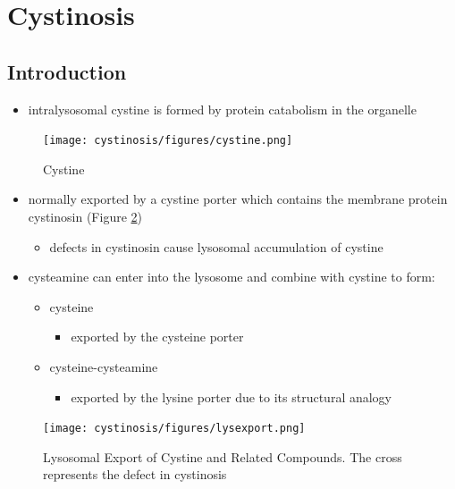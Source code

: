 \documentclass[12pt]{scrartcl}
\begin{document}
\section{Cystinosis}
\label{sec:orga965da1}
\subsection{Introduction}
\label{sec:org1264f4b}
\begin{itemize}
\item intralysosomal cystine is formed by protein catabolism in the organelle
\end{itemize}

\begin{figure}[htbp]
\centering
\texttt{[image: cystinosis/figures/cystine.png]}
\caption{\label{fig:org32774db}Cystine}
\end{figure}

\begin{itemize}
\item normally exported by a cystine porter which contains the membrane protein cystinosin (Figure \ref{fig:org7e9f884})
\begin{itemize}
\item defects in cystinosin cause lysosomal accumulation of cystine
\end{itemize}
\item cysteamine can enter into the lysosome and combine with cystine to form:
\begin{itemize}
\item cysteine
\begin{itemize}
\item exported by the cysteine porter
\end{itemize}
\item cysteine-cysteamine
\begin{itemize}
\item exported by the lysine porter due to its structural analogy
\end{itemize}
\end{itemize}
\end{itemize}

\begin{figure}[htbp]
\centering
\texttt{[image: cystinosis/figures/lysexport.png]}
\caption{\label{fig:org7e9f884}Lysosomal Export of Cystine and Related Compounds. The cross represents the defect in cystinosis}
\end{figure}
\end{document}
